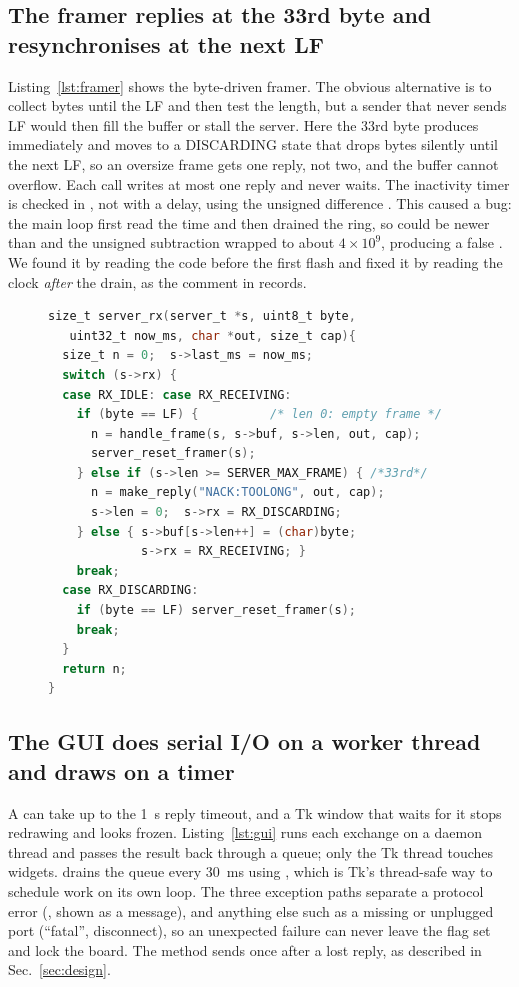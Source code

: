 \subsection{The framer replies at the 33rd byte and resynchronises at the next LF}
Listing~\ref{lst:framer} shows the byte-driven framer. The obvious alternative is to collect bytes until the LF and then test
the length, but a sender that never sends LF would then fill the buffer or stall the server. Here the 33rd byte produces
 immediately and moves to a DISCARDING state that drops bytes silently until the next LF, so an oversize frame
gets one reply, not two, and the buffer cannot overflow. Each call writes at most one reply and never waits. The inactivity
timer is checked in , not with a delay, using the unsigned difference . This caused a bug: the
main loop first read the time and then drained the ring, so  could be newer than  and the unsigned subtraction
wrapped to about $4\times10^9$, producing a false . We found it by reading the code before the first flash and fixed
it by reading the clock \emph{after} the drain, as the comment in  records.

\begin{figure}[t]
\begin{lstlisting}[float=false,language=C, caption={Framer (\texttt{server.c}, trimmed). At most one reply per call.}, label=lst:framer]
size_t server_rx(server_t *s, uint8_t byte,
   uint32_t now_ms, char *out, size_t cap){
  size_t n = 0;  s->last_ms = now_ms;
  switch (s->rx) {
  case RX_IDLE: case RX_RECEIVING:
    if (byte == LF) {          /* len 0: empty frame */
      n = handle_frame(s, s->buf, s->len, out, cap);
      server_reset_framer(s);
    } else if (s->len >= SERVER_MAX_FRAME) { /*33rd*/
      n = make_reply("NACK:TOOLONG", out, cap);
      s->len = 0;  s->rx = RX_DISCARDING;
    } else { s->buf[s->len++] = (char)byte;
             s->rx = RX_RECEIVING; }
    break;
  case RX_DISCARDING:
    if (byte == LF) server_reset_framer(s);
    break;
  }
  return n;
}
\end{lstlisting}
\end{figure}

\subsection{The GUI does serial I/O on a worker thread and draws on a timer}
A  can take up to the 1~s reply timeout, and a Tk window that waits for it stops redrawing and looks frozen. Listing~\ref{lst:gui}
runs each exchange on a daemon thread and passes the result back through a queue; only the Tk thread touches widgets. 
drains the queue every 30~ms using , which is Tk's thread-safe way to schedule work on its own loop. The three
exception paths separate a protocol error (, shown as a message), and anything else such as a missing or unplugged
port (``fatal'', disconnect), so an unexpected failure can never leave the  flag set and lock the board. The
 method sends  once after a lost reply, as described in Sec.~\ref{sec:design}.

